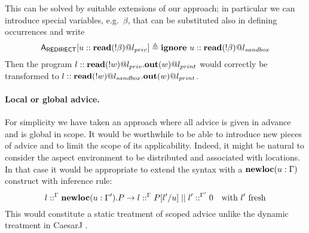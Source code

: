 \documentclass[a4paper]{llncs}
\newcommand{\netpar}{\mid\mid}
\newcommand{\Let}{{\bf let}}
\newcommand{\Letin}{{\bf in}}
\begin{document}
This can be solved by suitable extensions of our approach; in particular
we can introduce special variables, e.g.~$\beta$, that can be substituted
also in defining occurrences and write
$${\sf A}_{\sf REDIRECT}[u::{\bf read}(!\beta)@l_{priv}] \triangleq {\bf ignore}\
 u::{\bf read}(!\beta)@l_{sandbox}$$
Then the program
$l::{\bf read}(!w)@l_{priv}. {\bf out}(w)@l_{print}$
would correctly be transformed to
$l::{\bf read}(!w)@l_{sandbox}. {\bf out}(w)@l_{print}$.

\paragraph{Local or global advice.}

For simplicity we have taken an approach where all advice is given in
advance and is global in scope. It would be worthwhile to be able to
introduce new pieces of advice and to limit the scope of its
applicability. 
Indeed, it might be natural to consider the aspect environment to be
distributed and associated with locations.  In that case
it would be appropriate to extend the syntax with a ${\bf newloc}(u: \Gamma)$
construct with inference rule:
$$ l ::^\Gamma {\bf newloc}(u:\Gamma ').P \rightarrow l ::^\Gamma P[l' / u]
\netpar l' ::^{\Gamma '} 0 ~~~ \mbox{with }l'~\mbox{fresh}$$
This would constitute
a static treatment of scoped advice unlike the dynamic 
treatment 
in CaesarJ \cite{aracic2006oc}.
\end{document}
